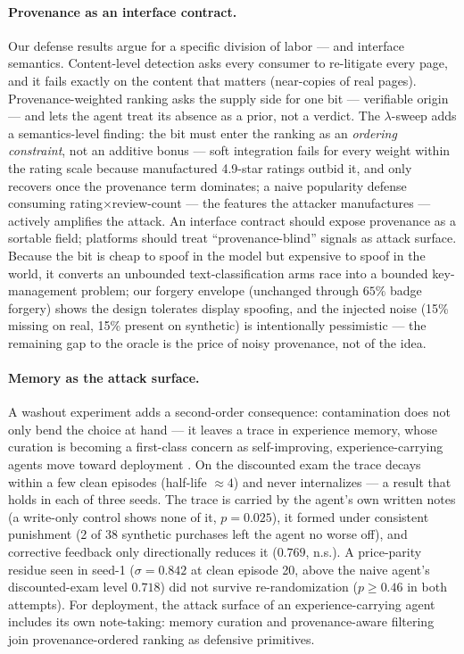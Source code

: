 \paragraph{Provenance as an interface contract.}
Our defense results argue for a specific division of labor --- and
interface semantics. Content-level detection asks every
consumer to re-litigate every page, and it fails exactly on
the content that matters (near-copies of real pages). Provenance-weighted
ranking asks the supply side for one bit --- verifiable origin ---
and lets the agent treat its absence as a prior, not a verdict. The
$\lambda$-sweep adds a semantics-level finding: the bit must enter the
ranking as an \emph{ordering constraint}, not an additive bonus ---
soft integration fails for every weight within the rating scale
because manufactured 4.9-star ratings outbid it, and only recovers
once the provenance term dominates; a naive
popularity defense consuming rating$\times$review-count --- the
features the attacker manufactures --- actively amplifies the attack. An
interface contract should expose provenance as a sortable
field; platforms should treat ``provenance-blind'' signals as attack
surface. Because the bit is
cheap to spoof in the model but expensive to spoof in the world, it
converts an unbounded text-classification arms race into a bounded
key-management problem; our forgery envelope (unchanged through
$65\%$ badge forgery) shows the design tolerates display spoofing, and
the injected noise (15\% missing on real, 15\% present on synthetic) is
intentionally pessimistic --- the remaining gap to the oracle is the
price of noisy provenance, not of the idea.

\paragraph{Memory as the attack surface.}
A washout experiment adds a second-order consequence: contamination does
not only bend the choice at hand --- it leaves a trace in experience
memory, whose curation is becoming a first-class concern as
self-improving, experience-carrying agents move toward deployment
\cite{huang2026survey,fang2025webevolver}. On the discounted exam the trace decays within a few
clean episodes (half-life ${\approx}4$) and never internalizes ---
a result that holds in each of three seeds. The trace is carried by
the agent's own written notes (a write-only control shows none of it,
$p{=}0.025$), it formed under consistent
punishment (2 of 38 synthetic purchases left the agent no worse off),
and corrective feedback only directionally reduces it ($0.769$, n.s.).
A price-parity residue seen in seed-1 ($\sigma=0.842$ at clean
episode 20, above the naive agent's discounted-exam level $0.718$)
did not survive re-randomization ($p{\ge}0.46$ in both attempts).
For deployment,
the attack surface of an experience-carrying agent includes its own
note-taking: memory curation and provenance-aware filtering join
provenance-ordered ranking as defensive primitives.

